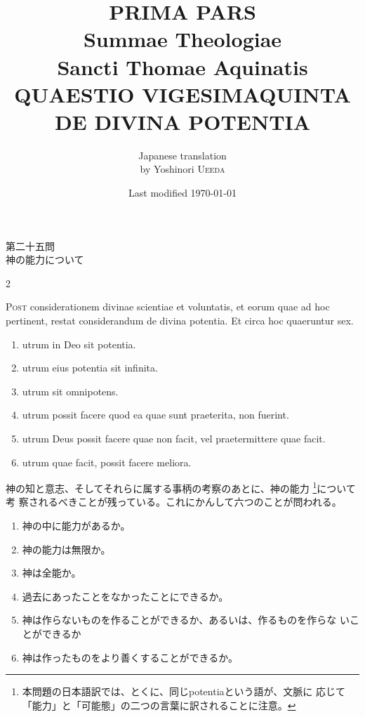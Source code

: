 \documentclass[paper=a4paper,fontsize=10pt,jafontsize=9pt,titlepage]{jlreq}
\title{{\bfseries PRIMA PARS}\\{\Huge Summae Theologiae}\\Sancti Thomae
Aquinatis\\{\sffamily QUAESTIO VIGESIMAQUINTA}\\DE DIVINA
POTENTIA}
\author{Japanese translation\\by Yoshinori {\scshape Ueeda}}
\date{Last modified \today}
\begin{document}
\maketitle

\begin{center}
{\Large 第二十五問\\神の能力について}
\end{center}


\begin{paracol}{2}

{\huge P}{\scshape ost} considerationem divinae scientiae et voluntatis,
et eorum quae ad hoc pertinent, restat considerandum de divina
potentia. Et circa hoc quaeruntur sex. 

\begin{enumerate}
 \item utrum in Deo sit potentia.
 \item utrum eius potentia sit infinita. 
 \item utrum sit omnipotens. 
 \item utrum possit facere quod ea quae sunt praeterita, non fuerint. 
 \item utrum Deus possit facere quae non facit, vel praetermittere quae
       facit. 
 \item utrum quae facit, possit facere meliora.
\end{enumerate}

\switchcolumn

神の知と意志、そしてそれらに属する事柄の考察のあとに、神の能力
 \footnote{本問題の日本語訳では、とくに、同じpotentiaという語が、文脈に
 応じて「能力」と「可能態」の二つの言葉に訳されることに注意。}について考
 察されるべきことが残っている。これにかんして六つのことが問われる。

\begin{enumerate}
 \item 神の中に能力があるか。
 \item 神の能力は無限か。
 \item 神は全能か。
 \item 過去にあったことをなかったことにできるか。
 \item 神は作らないものを作ることができるか、あるいは、作るものを作らな
       いことができるか
 \item 神は作ったものをより善くすることができるか。
\end{enumerate}

\end{paracol}
\end{document}
